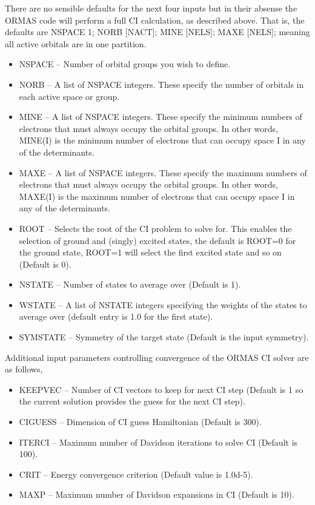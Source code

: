 \documentclass[11pt,fleqn]{article}
\begin{document}
There are no sensible defaults for the next four inputs but in their 
absense the ORMAS code will perform a full CI calculation, as described above. 
That is, the defaults are NSPACE 1; NORB [NACT]; MINE [NELS]; MAXE [NELS]; 
meaning all active orbitals are in one partition.

\begin{itemize}
\item  NSPACE  -- Number of orbital groups you wish to define.
\item  NORB    -- A list of NSPACE integers. These specify the 
number of orbitals in each active space or group.  
\item  MINE    -- A list of NSPACE integers. These specify the
minimum numbers of electrons that must always occupy the orbital groups.  
In other words, MINE(I) is the minimum number of electrons that can 
occupy space I in any of the determinants.  
\item  MAXE    -- A list of NSPACE integers. These specify the
maximum numbers of electrons that must always occupy the orbital groups.  
In other words, MAXE(I) is the maximum number of electrons that can 
occupy space I in any of the determinants.
\item  ROOT    -- Selects the root of the CI problem to solve for. 
This enables the selection of ground and (singly) excited states, 
the default is ROOT=0 for the ground state, ROOT=1 will select the 
first excited state and so on (Default is 0).
\item  NSTATE  -- Number of states to average over (Default is 1).
\item  WSTATE  -- A list of NSTATE integers specifying the weights of 
the states to average over (default entry is 1.0 for the first state).
\item  SYMSTATE -- Symmetry of the target state (Default is the input 
symmetry).
\end{itemize}

Additional input parameters controlling convergence of the ORMAS 
CI solver are as follows,

\begin{itemize}
\item  KEEPVEC -- Number of CI vectors to keep for next CI step
(Default is 1 so the current solution provides the guess for the next 
CI step).
\item  CIGUESS -- Dimension of CI guess Hamiltonian (Default is 300).
\item  ITERCI  -- Maximum number of Davidson iterations to solve CI
(Default is 100).
\item  CRIT    -- Energy convergence criterion (Default value is 1.0d-5).
\item  MAXP    -- Maximum number of Davidson expansions in CI
(Default is 10).
\end{itemize}
\end{document}
